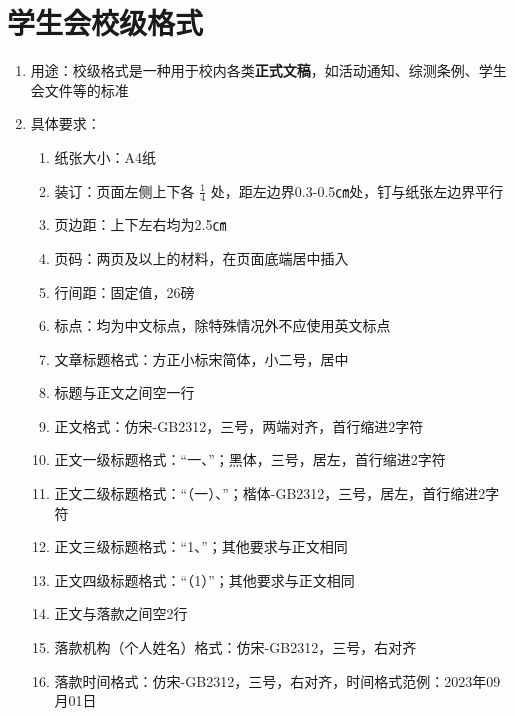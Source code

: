 \section[学生会校级格式]{学生会校级格式}
\begin{enumerate}
      \item 用途：校级格式是一种用于校内各类\textbf{正式文稿}，如活动通知、综测条例、学生会文件等的标准
      \item 具体要求：
            \begin{enumerate}
                  \item 纸张大小：A4纸
                  \item 装订：页面左侧上下各 $\frac{1}{4}$ 处，距左边界0.3-0.5㎝处，钉与纸张左边界平行
                  \item 页边距：上下左右均为2.5㎝
                  \item 页码：两页及以上的材料，在页面底端居中插入
                  \item 行间距：固定值，26磅
                  \item 标点：均为中文标点，除特殊情况\footnotemark 外不应使用英文标点
                  \item 文章标题格式：方正小标宋简体，小二号，居中
                  \item 标题与正文之间空一行
                  \item 正文格式：仿宋-GB2312，三号，两端对齐，首行缩进2字符
                  \item 正文一级标题格式：“一、”；黑体，三号，居左，首行缩进2字符
                  \item 正文二级标题格式：“（一）、”；楷体-GB2312，三号，居左，首行缩进2字符
                  \item 正文三级标题格式：“1、”；其他要求与正文相同
                  \item 正文四级标题格式：“（1）”；其他要求与正文相同
                  \item 正文与落款之间空2行
                  \item 落款机构（个人姓名）格式：仿宋-GB2312，三号，右对齐
                  \item 落款时间格式：仿宋-GB2312，三号，右对齐，时间格式范例：2023年09月01日
            \end{enumerate}
\end{enumerate}

